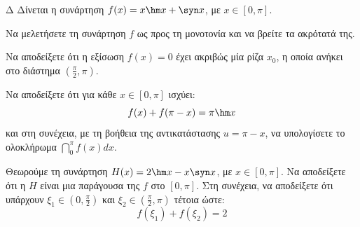 \begin{thema}{Δ}
Δίνεται η συνάρτηση $f(x) = x \hm x + \syn x$, με $x \in [0, \pi]$.
\begin{erwthma}
    \item Να μελετήσετε τη συνάρτηση $f$ ως προς τη μονοτονία και να βρείτε τα ακρότατά της.
    \item Να αποδείξετε ότι η εξίσωση $f(x) = 0$ έχει ακριβώς μία ρίζα $x_0$, η οποία ανήκει στο διάστημα $\displaystyle\left(\frac{\pi}{2}, \pi\right)$. 
    \item Να αποδείξετε ότι για κάθε $x \in [0, \pi]$ ισχύει:
    \[ f(x) + f(\pi - x) = \pi \hm x \]
    και στη συνέχεια, με τη βοήθεια της αντικατάστασης $u = \pi - x$, να υπολογίσετε το ολοκλήρωμα $\displaystyle \dint_0^\pi f(x) dx$.
    \item Θεωρούμε τη συνάρτηση $H(x) = 2\hm x - x \syn x$, με $x \in [0, \pi]$. Να αποδείξετε ότι η $H$ είναι μια παράγουσα της $f$ στο $[0, \pi]$. Στη συνέχεια, να αποδείξετε ότι υπάρχουν $\xi_1 \in \left(0, \frac{\pi}{2}\right)$ και $\xi_2 \in \left(\frac{\pi}{2}, \pi\right)$ τέτοια ώστε:
    \[ f(\xi_1) + f(\xi_2) = 2 \]
\end{erwthma}
\end{thema}
